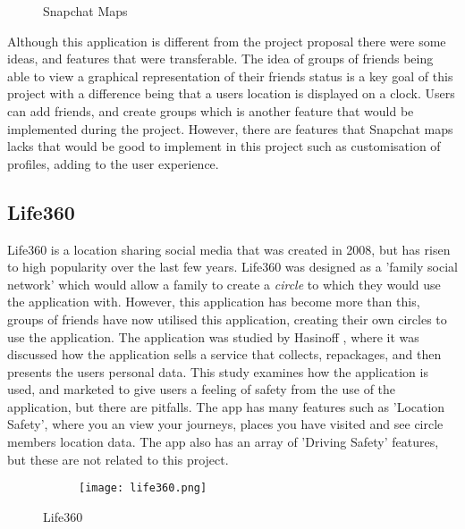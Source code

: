 \begin{figure}[!htbp]
    \centering
    \begin{subfigure}[b]{0.6\textwidth}
    \end{subfigure}
    \caption[Snapchat Maps]{Snapchat Maps \cite{snapMapImg}}
    \label{fig:snapMap}
\end{figure}
\FloatBarrier

Although this application is different from the project proposal there were some ideas, and features that were transferable. The idea of groups of friends being able to view a graphical representation of their friends status is a key goal of this project with a difference being that a users location is displayed on a clock. Users can add friends, and create groups which is another feature that would be implemented during the project. However, there are features that Snapchat maps lacks that would be good to implement in this project such as customisation of profiles, adding to the user experience.

\subsection{Life360}

Life360 is a location sharing social media that was created in 2008, but has risen to high popularity over the last few years. Life360 was designed as a 'family social network' which would allow a family to create a \textit{circle} to which they would use the application with. However, this application has become more than this, groups of friends have now utilised this application, creating their own circles to use the application. The application was studied by Hasinoff \cite{life360}, where it was discussed how the application sells a service that collects, repackages, and then presents the users personal data. This study examines how the application is used, and marketed to give users a feeling of safety from the use of the application, but there are pitfalls. The app has many features such as 'Location Safety', where you an view your journeys, places you have visited and see circle members location data. The app also has an array of 'Driving Safety' features, but these are not related to this project. 

\begin{figure}[!htbp]
    \centering
    \begin{subfigure}[b]{0.21\textwidth}
        {\texttt{[image: life360.png]}}
    \end{subfigure}
    \caption[Life360]{Life360 \cite{lifeLoc}}
    \label{fig:life360}
\end{figure}
\FloatBarrier

